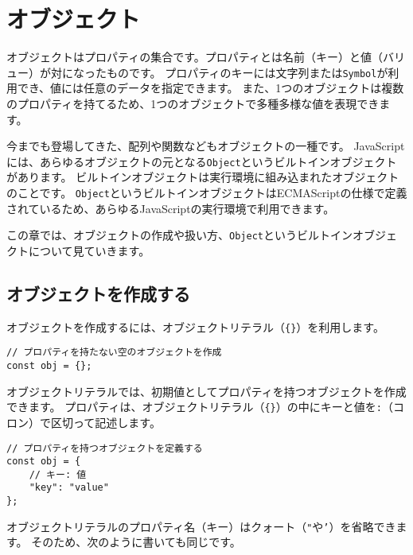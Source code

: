 \hypertarget{object}{%
\chapter{オブジェクト}\label{object}}
\thispagestyle{frontheadings}

オブジェクトはプロパティの集合です。プロパティとは名前（キー）と値（バリュー）が対になったものです。
プロパティのキーには文字列または\texttt{Symbol}が利用でき、値には任意のデータを指定できます。
また、1つのオブジェクトは複数のプロパティを持てるため、1つのオブジェクトで多種多様な値を表現できます。

今までも登場してきた、配列や関数などもオブジェクトの一種です。
JavaScriptには、あらゆるオブジェクトの元となる\texttt{Object}というビルトインオブジェクトがあります。
ビルトインオブジェクトは実行環境に組み込まれたオブジェクトのことです。
\texttt{Object}というビルトインオブジェクトはECMAScriptの仕様で定義されているため、あらゆるJavaScriptの実行環境で利用できます。

この章では、オブジェクトの作成や扱い方、\texttt{Object}というビルトインオブジェクトについて見ていきます。

\hypertarget{create-object}{%
\section{オブジェクトを作成する}\label{create-object}}

オブジェクトを作成するには、オブジェクトリテラル（\texttt{\{\}}）を利用します。

\begin{lstlisting}
// プロパティを持たない空のオブジェクトを作成
const obj = {};
\end{lstlisting}

オブジェクトリテラルでは、初期値としてプロパティを持つオブジェクトを作成できます。
プロパティは、オブジェクトリテラル（\texttt{\{\}}）の中にキーと値を\texttt{:}（コロン）で区切って記述します。

\begin{lstlisting}
// プロパティを持つオブジェクトを定義する
const obj = {
    // キー: 値
    "key": "value"
};
\end{lstlisting}

オブジェクトリテラルのプロパティ名（キー）はクォート（\texttt{"}や\texttt{'}）を省略できます。
そのため、次のように書いても同じです。

